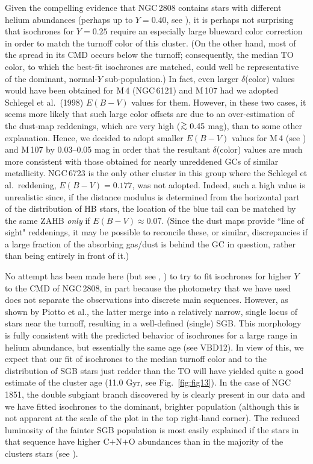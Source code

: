 \documentclass[12pt,preprint]{aastex}
\newcommand\gta{\mathrel{\hbox{\raise 0.6 ex \hbox{$>$}\kern
                   -1.7 ex\lower .5 ex\hbox{$\sim$}}}}
\begin{document}
Given the compelling evidence that NGC$\,$2808 contains stars with different
helium abundances (perhaps up to $Y = 0.40$, see \citealt{pba07}), it is perhaps
not surprising that isochrones for $Y = 0.25$ require an especially large
blueward color correction in order to match the turnoff color of this cluster.
(On the other hand, most of the spread in its CMD occurs below the turnoff;
consequently, the median TO color, to which the best-fit isochrones are matched,
could well be representative of the dominant, normal-$Y$ sub-population.)  In
fact, even larger $\delta$(color) values would have been obtained for
M$\,$4 (NGC$\,$6121) and M$\,$107 had we adopted Schlegel et al.~(1998)
$E(B-V)$ values for them.   However, in these two cases, it seems more likely
that such large color offsets are due to an over-estimation of the dust-map
reddenings, which are very high ($\gta 0.45$ mag), than to some other
explanation.  Hence, we decided to adopt smaller $E(B-V)$ values for M$\,$4 (see
\citealt{hsv12}) and M$\,$107 by 0.03--0.05 mag in order that the resultant
$\delta$(color) values are much more consistent with those obtained for nearly
unreddened GCs of similar metallicity.  NGC$\,$6723 is the only other cluster in
this group where the Schlegel et al.~reddening, $E(B-V) = 0.177$, was not
adopted.  Indeed, such a high value is unrealistic since, if the distance
modulus is determined from the horizontal part of the distribution of HB stars,
the location of the blue tail can be matched by the same ZAHB {\it only} if
$E(B-V) \approx 0.07$.  (Since the dust maps provide ``line of sight"
reddenings, it may be possible to reconcile these, or similar, discrepancies if
a large fraction of the absorbing gas/dust is behind the GC in question, rather
than being entirely in front of it.)

No attempt has been made here (but see \citealt{pba07}, \citealt{mpb12c})
to try to fit isochrones for higher $Y$ to the CMD of
NGC$\,$2808, in part because the photometry that we have used does not separate
the observations into discrete main sequences.  However, as shown by Piotto
et al., the latter merge into a relatively narrow, single locus of stars
near the turnoff, resulting in a well-defined (single) SGB.  This morphology is
fully consistent with the predicted behavior of isochrones for a large range in
helium abundance, but essentially the same age (see VBD12).  In view of this,
we expect that our fit of isochrones to the median turnoff color and to the
distribution of SGB stars just redder than the TO will have yielded quite a 
good estimate of the cluster age (11.0 Gyr, see Fig.~\ref{fig:fig13}).  In the
case of NGC$\,$1851, the double subgiant branch discovered by \citet{mbp08} is
clearly present in our data and we have fitted isochrones to the dominant,
brighter population (although this is not apparent at the scale of the plot in
the top right-hand corner).  The reduced luminosity of the
fainter SGB population is most easily explained if the stars in that sequence
have higher C$+$N$+$O abundances than in the majority of the clusters stars
(see \citealt{csp08}).
\end{document}
